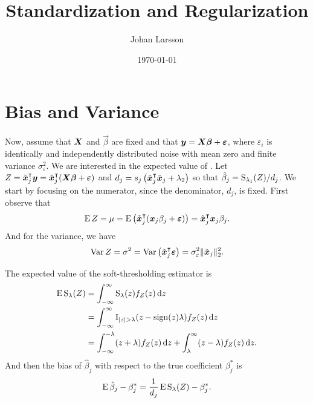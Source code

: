 


\newcommand{\mv}[1]{{\boldsymbol{\mathrm{#1}}}}

\title{Standardization and Regularization}
\author[1,*]{Johan Larsson}
\date{\today}

\usepackage[style=alphabetic]{biblatex}




\maketitle




\section{Bias and Variance}

Now, assume that \(\boldsymbol{X}\) and \(\vec{\beta}\) are fixed and that \(\boldsymbol{y} = \boldsymbol{X}\boldsymbol{\beta} + \boldsymbol{\varepsilon}\), where \(\varepsilon_i\) is identically and independently distributed noise with mean zero and finite variance \(\sigma_\varepsilon^2\). We are interested in the expected value of . Let \(Z = \tilde{\boldsymbol{x}}_j^\intercal \boldsymbol{y} = \tilde{\boldsymbol{x}}_j^\intercal(\boldsymbol{X}\boldsymbol{\beta} + \boldsymbol{\varepsilon})\) and \(d_j = s_j\left(\tilde{\boldsymbol{x}}_j^\intercal \tilde{\boldsymbol{x}}_j + \lambda_2\right)\) so that \(\hat{\beta}_j = \operatorname{S}_{\lambda_1}(Z)/d_j\). We start by focusing on the numerator, since the denominator, \(d_j\), is fixed. First observe that
\[
  \operatorname{E} Z = \mu = \operatorname{E} \left( \tilde{\boldsymbol{x}}_j^\intercal (\boldsymbol{x}_j\beta_j + \boldsymbol{\varepsilon}) \right)  = \tilde{\boldsymbol{x}}_j^\intercal\boldsymbol{x}_j \beta_j.
\]
And for the variance, we have
\[
  \operatorname{Var} Z = \sigma^2 = \operatorname{Var}\left(\tilde{\boldsymbol{x}}_j ^\intercal \boldsymbol{\varepsilon}\right) = \sigma_\varepsilon^2 \lVert \tilde{\boldsymbol{x}}_j\rVert_2^2 .
\]

The expected value of the soft-thresholding estimator is
\begin{align}
  \label{eq:st-expected-value}
    \operatorname{E} \operatorname{S}_\lambda(Z) & = \int_{-\infty}^\infty \operatorname{S}_\lambda(z) f_Z(z) \mathop{}\!\mathrm{d} z                                                   \nonumber \\
                      & = \int_{-\infty}^\infty \operatorname{I}_{|z| > \lambda} (z -\operatorname{sign}(z)\lambda) f_Z(z) \mathop{}\!\mathrm{d} z                         \nonumber \\
                      & = \int_{-\infty}^{-\lambda}(z + \lambda)f_Z(z) \mathop{}\!\mathrm{d} z + \int_{\lambda}^\infty (z - \lambda)f_Z(z) \mathop{}\!\mathrm{d} z.
\end{align}
And then the bias of \(\hat\beta_j\) with respect to the true coefficient \(\beta_j^*\) is
\begin{equation}
  \label{eq:betahat-bias}
\operatorname{E} \hat\beta_j - \beta_j^* = \frac{1}{d_j}\operatorname{E} \operatorname{S}_\lambda(Z) - \beta^*_j.
\end{equation}

